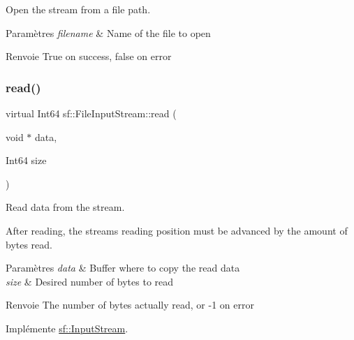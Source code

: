Open the stream from a file path. 


\begin{DoxyParams}{Paramètres}
{\em filename} & Name of the file to open\\
\hline
\end{DoxyParams}
\begin{DoxyReturn}{Renvoie}
True on success, false on error 
\end{DoxyReturn}
\mbox{\label{classsf_1_1FileInputStream_ad1e94c4152429f485db224c44ee1eb50}} 
\subsubsection{\texorpdfstring{read()}{read()}}
{\footnotesize\ttfamily virtual Int64 sf\+::\+File\+Input\+Stream\+::read (\begin{DoxyParamCaption}\item[{void $\ast$}]{data,  }\item[{Int64}]{size }\end{DoxyParamCaption})\hspace{0.3cm}{\ttfamily [virtual]}}



Read data from the stream. 

After reading, the stream\textquotesingle{}s reading position must be advanced by the amount of bytes read.


\begin{DoxyParams}{Paramètres}
{\em data} & Buffer where to copy the read data \\
\hline
{\em size} & Desired number of bytes to read\\
\hline
\end{DoxyParams}
\begin{DoxyReturn}{Renvoie}
The number of bytes actually read, or -\/1 on error 
\end{DoxyReturn}


Implémente \hyperlink{classsf_1_1InputStream_a8dd89c74c1acb693203f50e750c6ae53}{sf\+::\+Input\+Stream}.

\mbox{\label{classsf_1_1FileInputStream_abdaf5700d4e1de07568e7829106b4eb9}} 
